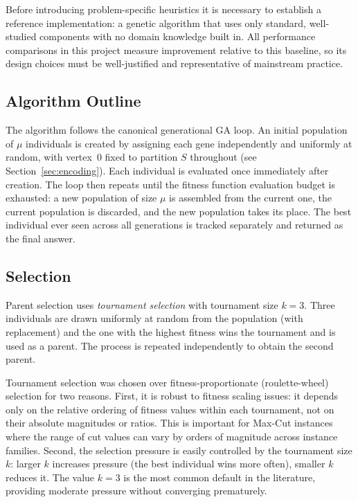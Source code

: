 \documentclass[12pt]{article}
\begin{document}
Before introducing problem-specific heuristics it is necessary to establish a
reference implementation: a genetic algorithm that uses only standard, well-studied
components with no domain knowledge built in.
All performance comparisons in this project measure improvement relative to this
baseline, so its design choices must be well-justified and representative of
mainstream practice.

\subsection{Algorithm Outline}

The algorithm follows the canonical generational GA loop.
An initial population of $\mu$ individuals is created by assigning each gene
independently and uniformly at random, with vertex~0 fixed to partition $S$
throughout (see Section~\ref{sec:encoding}).
Each individual is evaluated once immediately after creation.
The loop then repeats until the fitness function evaluation budget is exhausted:
a new population of size $\mu$ is assembled from the current one, the current
population is discarded, and the new population takes its place.
The best individual ever seen across all generations is tracked separately and
returned as the final answer.

\subsection{Selection}

Parent selection uses \emph{tournament selection} with tournament size $k = 3$.
Three individuals are drawn uniformly at random from the population (with
replacement) and the one with the highest fitness wins the tournament and is
used as a parent.
The process is repeated independently to obtain the second parent.

Tournament selection was chosen over fitness-proportionate (roulette-wheel)
selection for two reasons.
First, it is robust to fitness scaling issues: it depends only on the relative
ordering of fitness values within each tournament, not on their absolute magnitudes
or ratios.
This is important for Max-Cut instances where the range of cut values can vary by
orders of magnitude across instance families.
Second, the selection pressure is easily controlled by the tournament size $k$:
larger $k$ increases pressure (the best individual wins more often), smaller $k$
reduces it.
The value $k = 3$ is the most common default in the literature, providing moderate
pressure without converging prematurely.
\end{document}
